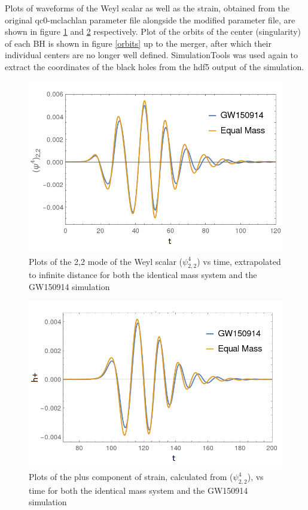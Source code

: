 \documentclass[aps,twocolumn,secnumarabic,nobalancelastpage,amsmath,amssymb,
nofootinbib]{revtex4}
\begin{document}
    Plots of waveforms of the Weyl scalar as well as the strain, obtained from the original qc0-mclachlan parameter file alongside the modified parameter file, are shown in figure \ref{weyl} and \ref{strain} respectively.  Plot of the orbits of the center (singularity) of each BH is shown in figure \ref{orbits} up to the merger, after which their individual centers are no longer well defined. SimulationTools was used again to extract the coordinates of the black holes from the hdf5 output of the simulation.
    \newline
    	\begin{figure}[h]
    		\includegraphics[width=\linewidth]{weyl.png}
    		\caption{Plots of the 2,2 mode of the Weyl scalar ($\psi_{2,2}^{4}$) vs time, extrapolated to infinite distance for both the identical mass system and the GW150914 simulation}
    		\label{weyl}
    	\end{figure}
    		\begin{figure}[h]
    			\includegraphics[width=\linewidth]{strain.png}
    			\caption{Plots of the plus component of strain, calculated from ($\psi_{2,2}^{4}$), vs time for both the identical mass system and the GW150914 simulation}
    			\label{strain}
    		\end{figure}
    
\end{document}

